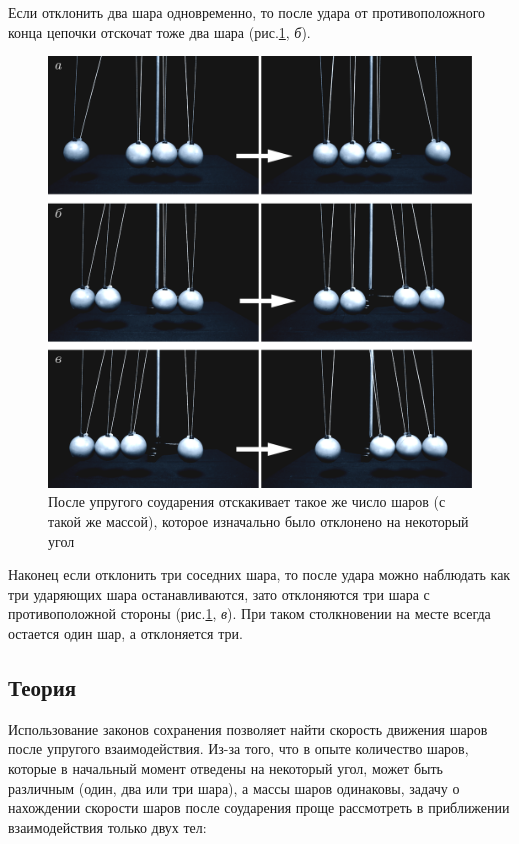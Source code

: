 \documentclass[All.tex]{subfiles}
\begin{document}
Если отклонить два шара одновременно, то после удара от противоположного конца цепочки отскочат тоже два шара (рис.\ref{impact-3}, \textit{б}).
\begin{figure}[H]
	\centering 	
	\includegraphics[width=0.9\linewidth]{impact-3.png}
	\caption{После упругого соударения отскакивает такое же число шаров (с такой же массой), которое изначально было отклонено на некоторый угол}\label{impact-3}
\end{figure}

Наконец если отклонить три соседних шара, то после удара можно наблюдать как три ударяющих шара останавливаются, зато отклоняются три шара с противоположной стороны (рис.\ref{impact-3}, \textit{в}).
При таком столкновении на месте всегда остается один шар, а отклоняется три. 

\subsection*{\textcolor{PineGreen}{Теория}}

Использование законов сохранения позволяет найти скорость движения шаров после упругого взаимодействия.
Из-за того, что в опыте количество шаров, которые в начальный момент отведены на некоторый угол, может быть различным (один, два или три шара), а массы шаров одинаковы, задачу о нахождении скорости шаров после соударения проще рассмотреть в приближении взаимодействия только двух тел:
\end{document}
